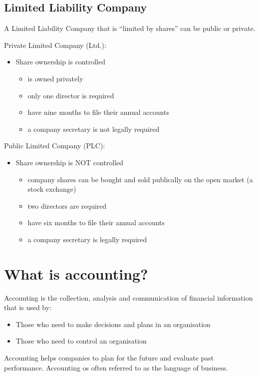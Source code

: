 \subsection{Limited Liability Company}
A Limited Liability Company that is ``limited by shares'' can be public or private.

Private Limited Company (Ltd.):
\begin{itemize}
    \item Share ownership is controlled
          \begin{itemize}
              \item is owned privately
              \item only one director is required
              \item have nine months to file their annual accounts
              \item a company secretary is not legally required
          \end{itemize}
\end{itemize}

Public Limited Company (PLC):
\begin{itemize}
    \item Share ownership is NOT controlled
          \begin{itemize}
              \item company shares can be bought and sold publically on the open market (a stock exchange)
              \item two directors are required
              \item have six months to file their annual accounts
              \item a company secretary is legally required
          \end{itemize}
\end{itemize}
\section{What is accounting?}
Accounting is the collection, analysis and communication of financial information that is used by:
\begin{itemize}
    \item Those who need to make decisions and plans in an organisation
    \item Those who need to control an organisation
\end{itemize}
Accounting helps companies to plan for the future and evaluate past performance. Accounting os often referred to as the language of business.
